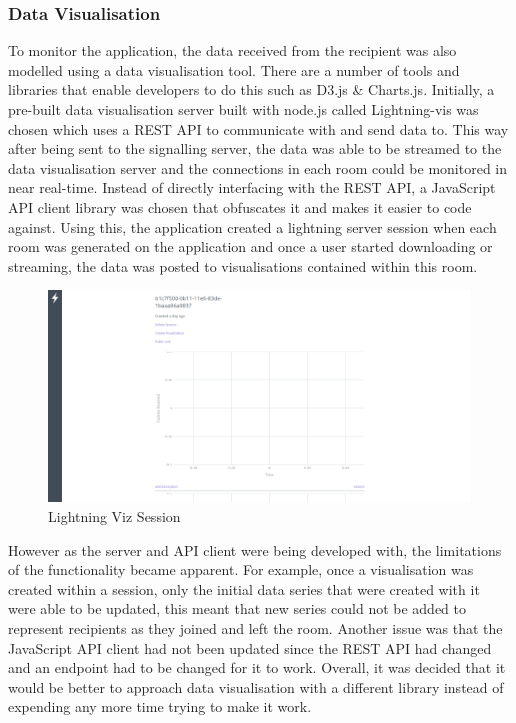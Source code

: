 \documentclass[]{report}
\begin{document}
				\subsubsection{Data Visualisation}
				To monitor the application, the data received from the recipient was also modelled using a data visualisation tool. There are a number of tools and libraries that enable developers to do this such as D3.js \& Charts.js. Initially, a pre-built data visualisation server built with node.js called Lightning-vis was chosen which uses a REST API to communicate with and send data to. This way after being sent to the signalling server, the data was able to be streamed to the data visualisation server and the connections in each room could be monitored in near real-time. Instead of directly interfacing with the REST API, a JavaScript API client library was chosen that obfuscates it and makes it easier to code against. Using this, the application created a lightning server session when each room was generated on the application and once a user started downloading or streaming, the data was posted to visualisations contained within this room. 
								
				\begin{figure}[H]
					\caption{Lightning Viz Session}
					\centering
					\includegraphics[scale=0.25]{lightning-viz.png}
				\end{figure}	
				
				However as the server and API client were being developed with, the limitations of the functionality became apparent. For example, once a visualisation was created within a session, only the initial data series that were created with it were able to be updated, this meant that new series could not be added to represent recipients as they joined and left the room. Another issue was that the JavaScript API client had not been updated since the REST API had changed and an endpoint had to be changed for it to work. Overall, it was decided that it would be better to approach data visualisation with a different library instead of expending any more time trying to make it work. 
\end{document}
